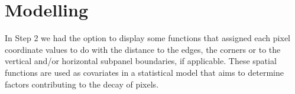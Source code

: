 \documentclass[11pt,a4paper,twosided]{article}
\begin{document}
\section{Modelling}\label{model}

In Step 2 we had the option to display some functions that assigned each pixel coordinate 
values to do with the distance to the edges, the corners or to the vertical and/or horizontal
subpanel boundaries, if applicable. These spatial functions are used as covariates in a
statistical model that aims to determine factors contributing to the decay of pixels.








{}


\end{document}
